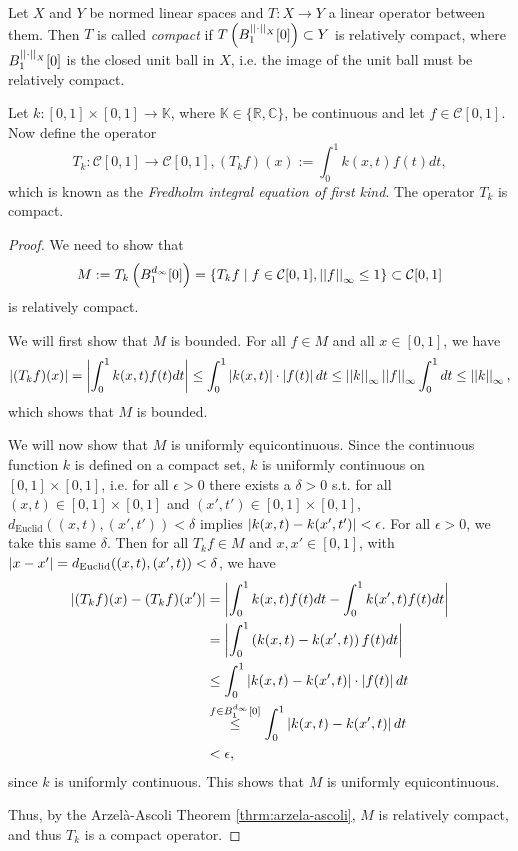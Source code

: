 \begin{defn}\label{defn:compact_operator}
	Let $X$ and $Y$ be normed linear spaces and $T: X\to Y$ a linear operator between them. Then $T$ is called \textit{compact} if $T\left(B^{\left\vert\left\vert \cdot \right\vert\right\vert_{X}}_{1}[0]\right) \subset Y$ is relatively compact, where $B_{1}^{\left\vert\left\vert \cdot \right\vert\right\vert_{X}}[0]$ is the closed unit ball in $X$, i.e. the image of the unit ball must be relatively compact.
\end{defn}

\begin{exmp}\label{exmp:compact-operator}
	Let $k: [0, 1]\times [0, 1]\to\mathbb K$, where $\mathbb K\in \{\mathbb R, \mathbb C\}$, be continuous and let $f\in \mathcal C[0, 1]$. Now define the operator
	\[
		T_k: \mathcal C[0, 1]\to\mathcal C[0, 1], (T_{k}f)(x) := \int_{0}^{1}k(x, t)f(t)dt,
	\]
	which is known as the \textit{Fredholm integral equation of first kind}. The operator $T_k$ is compact.
\end{exmp}

\begin{proof}
	We need to show that 
	\[
		M := T_k\left(B^{d_{\infty}}_{1}[0]\right) = \left\{ T_kf \mid f\in \mathcal C[0, 1], \left\vert\left\vert f \right\vert\right\vert_{\infty} \leq 1 \right\} \subset \mathcal C[0, 1]
	\]
	is relatively compact. 
	
	We will first show that $M$ is bounded. For all $f\in M$ and all $x\in [0, 1]$, we have
	\begin{align*}
		\left\vert (T_kf)(x) \right\vert = \left\vert \int_{0}^{1} k(x, t)f(t)dt \right\vert \leq \int_{0}^{1}\left\vert k(x, t) \right\vert\cdot\left\vert f(t) \right\vert dt \leq \left\vert\left\vert k \right\vert\right\vert_{\infty}\left\vert\left\vert f \right\vert\right\vert_{\infty}\int_{0}^{1}dt \leq \left\vert\left\vert k \right\vert\right\vert_{\infty},
	\end{align*}
	which shows that $M$ is bounded.
	
	We will now show that $M$ is uniformly equicontinuous. Since the continuous function $k$ is defined on a compact set, $k$ is uniformly continuous on $[0, 1]\times [0, 1]$, i.e. for all $\epsilon > 0$ there exists a $\delta > 0$ s.t. for all $(x, t)\in [0, 1]\times [0, 1]$ and $(x', t')\in [0, 1]\times [0, 1]$, $d_{\text{Euclid}}((x, t), (x', t')) < \delta$ implies $\left\vert k(x, t) - k(x', t') \right\vert < \epsilon$. For all $\epsilon > 0$, we take this same $\delta$. Then for all $T_kf\in M$ and $x, x'\in [0, 1]$, with $\left\vert x - x' \right\vert = d_{\text{Euclid}}((x, t), (x', t)) < \delta$, we have
	\begin{align*}
		\left\vert (T_kf)(x) - (T_kf)(x') \right\vert &= \left\vert \int_{0}^{1}k(x, t)f(t)dt - \int_{0}^{1}k(x', t)f(t)dt \right\vert 
		\\ &= \left\vert \int_{0}^{1}\left(k(x, t) - k(x', t)\right)f(t)dt \right\vert
		\\ &\leq \int_{0}^{1}\left\vert k(x, t) - k(x', t) \right\vert\cdot \left\vert f(t) \right\vert dt
		\\ &\overset{f \in B_{1}^{d_{\infty}}[0]}{\leq} \int_{0}^{1}\left\vert k(x, t) - k(x', t) \right\vert dt
		\\ &< \epsilon, 
	\end{align*}
	since $k$ is uniformly continuous. This shows that $M$ is uniformly equicontinuous. 
	
	Thus, by the Arzel\`a-Ascoli Theorem \ref{thrm:arzela-ascoli}, $M$ is relatively compact, and thus $T_k$ is a compact operator. 
\end{proof}